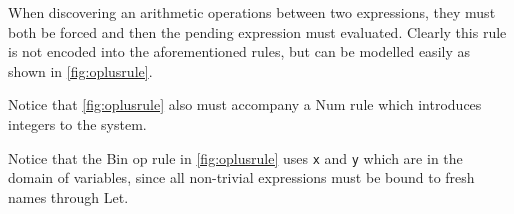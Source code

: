 When discovering an arithmetic operations between two expressions, they must both be forced and then the pending expression must evaluated.
Clearly this rule is not encoded into the aforementioned rules, but can be modelled easily as shown in \autoref{fig:oplusrule}.
\begin{figure}[ht]
  \begin{mdframed}[style=style1]
        \begin{subfigure}[b]{1\textwidth}
        \vspace*{0.49cm}
          \begin{prooftree}
          \end{prooftree}   
        \end{subfigure}
        \begin{subfigure}[b]{1\textwidth}
        \vspace*{0.49cm}
            \begin{prooftree}
            \end{prooftree}   
        \end{subfigure}
  \end{mdframed}
  \caption{}
  \label{fig:oplusrule}
\end{figure}
Notice that \autoref{fig:oplusrule} also must accompany a Num rule which introduces integers to the system.
\begin{remark}
  Notice that the Bin op rule in \autoref{fig:oplusrule} uses \texttt{x} and \texttt{y} which are in the domain of variables, since all non-trivial expressions must be bound to fresh names through Let.
\end{remark}

